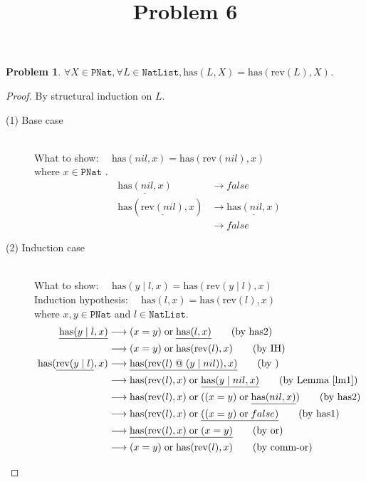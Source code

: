 \documentclass[12pt, a4paper]{article}
\title{Problem 6}
\date{\vspace{-5ex}}
\newtheorem{problem}{Problem}
\newcommand{\rel}[1]{\mathrel{#1}}
\newcommand{\rmx}[1]{\mathrm{#1}}
\newcommand{\larrow}{\longrightarrow}
\newcommand{\under}{\underline}
\begin{document}
\maketitle

\begin{problem}
$\forall X \in \mathtt{PNat}, \forall L \in \mathtt{NatList}, \rmx{has}(L, X) = \rmx{has}(\rmx{rev}(L), X)$.
\end{problem}
\begin{proof}
By structural induction on $L$.

\begin{description}
\item[(1) Base case]~\\
\noindent
What to show: $\quad \rmx{has}(nil, x) = \rmx{has}(\rmx{rev}(nil), x)$ \\
where $x \in \mathtt{PNat}$ .
\begin{align*}
\under{\rmx{has}(nil, x)}
	&\larrow false \tag{by has1} \\
\rmx{has}(\under{\rmx{rev}(nil)}, x)
	&\larrow \under{\rmx{has}(nil, x)} \tag{by rev1} \\
	&\larrow false \tag{by has1}
\end{align*}

\item[(2) Induction case]~\\
What to show: $\quad \rmx{has}(y \rel{|} l, x) = \rmx{has}(\rmx{rev}(y \rel{|} l), x)$ \\
Induction hypothesis: $\quad \rmx{has}(l, x) = \rmx{has}(\rmx{rev}(l), x)$  \\
where $x, y \in \mathtt{PNat}$ and $l \in \mathtt{NatList}$.
\begin{align*}
\under{\rmx{has}(y \rel{|} l, x)}
	&\larrow (x = y) \rel{\rmx{or}} \under{\rmx{has}(l, x)}  \tag{by has2} \\
	&\larrow (x = y) \rel{\rmx{or}} \rmx{has}(\rmx{rev}(l), x)  \tag{by IH} \\
\rmx{has}(\under{\rmx{rev}(y \rel{|} l)}, x)
	&\larrow \under{\rmx{has}(\rmx{rev}(l) \rel{@} (y \rel{|} nil)), x)} \tag{by } \\
	&\larrow \rmx{has}(\rmx{rev}(l), x) \rel{\rmx{or}} \under{\rmx{has}(y \rel{|} nil, x)} \tag{by Lemma~\ref{lm1}} \\
	&\larrow \rmx{has}(\rmx{rev}(l), x) \rel{\rmx{or}} ((x = y) \rel{\rmx{or}} \under{\rmx{has}(nil, x)}) \tag{by has2} \\
	&\larrow \rmx{has}(\rmx{rev}(l), x) \rel{\rmx{or}} \under{((x = y) \rel{\rmx{or}} false)} \tag{by has1} \\
	&\larrow \under{\rmx{has}(\rmx{rev}(l), x) \rel{\rmx{or}} (x = y)} \tag{by or} \\
	&\larrow (x = y) \rel{\rmx{or}} \rmx{has}(\rmx{rev}(l), x) \tag{by comm-or}
\end{align*}

\end{description}

\end{proof}
\end{document}
